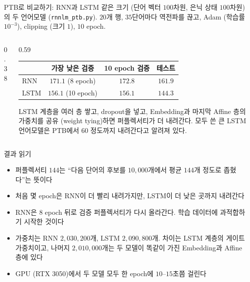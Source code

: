 \documentclass[aspectratio=169,11pt]{beamer}
\begin{document}
\begin{frame}{PTB로 비교하기: RNN과 LSTM}
같은 크기 (단어 벡터 $100$차원, 은닉 상태 $100$차원)의 두 언어모델 (\texttt{rnnlm\_ptb.py}).
$20$개 행, $35$단어마다 역전파를 끊고, Adam (학습률 $10^{-3}$), clipping (크기 $1$), $10$ epoch.
\vskip2mm
\begin{columns}[c,onlytextwidth]
\begin{column}{0.38\textwidth}
\end{column}
\begin{column}{0.59\textwidth}
\small
\setlength{\tabcolsep}{4pt}
\begin{tabular}{@{}lccc@{}}
\toprule
& 가장 낮은 검증 & 10 epoch 검증 & 테스트 \\
\midrule
RNN & $171.1$ (8 epoch) & $172.8$ & $161.9$ \\
LSTM & $156.1$ (10 epoch) & $156.1$ & $144.3$ \\
\bottomrule
\end{tabular}
\vskip3mm
\begin{remarkbox}
LSTM 계층을 여러 층 쌓고, dropout을 넣고, Embedding과 마지막 Affine 층의 가중치를 공유
(weight tying)하면 퍼플렉서티가 더 내려간다.
모두 쓴 큰 LSTM 언어모델은 PTB에서 $60$ 정도까지 내려간다고 알려져 있다.
\end{remarkbox}
\end{column}
\end{columns}
\end{frame}

\begin{frame}{결과 읽기}
\begin{itemize}
\item 퍼플렉서티 $144$는 ``다음 단어의 후보를 $10{,}000$개에서 평균 $144$개 정도로 좁혔다''는 뜻이다
\item 처음 몇 epoch은 RNN이 더 빨리 내려가지만, LSTM이 더 낮은 곳까지 내려간다
\item RNN은 8 epoch 뒤로 검증 퍼플렉서티가 다시 올라간다. 학습 데이터에 과적합하기 시작한 것이다
\item 가중치는 RNN $2{,}030{,}200$개, LSTM $2{,}090{,}800$개. 차이는 LSTM 계층의 게이트 가중치이고,
나머지 $2{,}010{,}000$개는 두 모델이 똑같이 가진 Embedding과 Affine 층에 있다
\item GPU (RTX 3050)에서 두 모델 모두 한 epoch에 $10$--$15$초쯤 걸린다
\end{itemize}
\end{frame}
\end{document}
